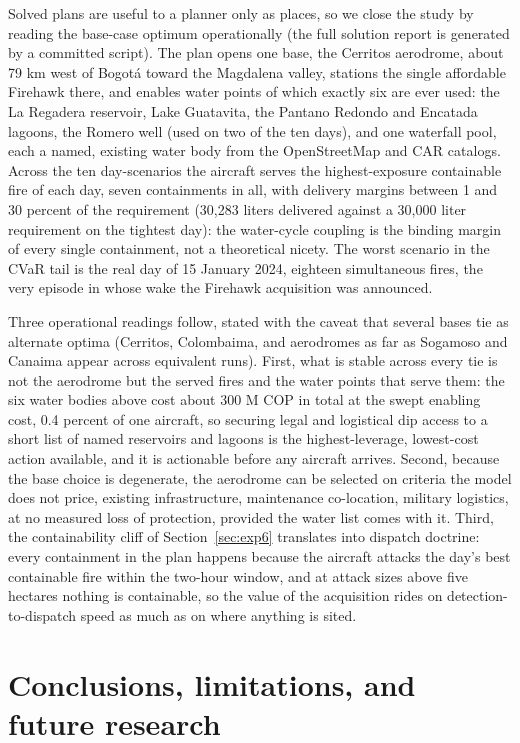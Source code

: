 \documentclass[11pt]{article}
\begin{document}
Solved plans are useful to a planner only as places, so we close the
study by reading the base-case optimum operationally (the full
solution report is generated by a committed script). The plan opens
one base, the Cerritos aerodrome, about 79 km west of Bogot{\'a}
toward the Magdalena valley, stations the single affordable Firehawk
there, and enables water points of which exactly six are ever used:
the La Regadera reservoir, Lake Guatavita, the Pantano Redondo and
Encatada lagoons, the Romero well (used on two of the ten days), and
one waterfall pool, each a named, existing water body from the
OpenStreetMap and CAR catalogs. Across the ten day-scenarios the
aircraft serves the highest-exposure containable fire of each day,
seven containments in all, with delivery margins between 1 and 30
percent of the requirement (30,283 liters delivered against a 30,000
liter requirement on the tightest day): the water-cycle coupling is
the binding margin of every single containment, not a theoretical
nicety. The worst scenario in the CVaR tail is the real day of 15
January 2024, eighteen simultaneous fires, the very episode in whose
wake the Firehawk acquisition was announced.

Three operational readings follow, stated with the caveat that
several bases tie as alternate optima (Cerritos, Colombaima, and
aerodromes as far as Sogamoso and Canaima appear across equivalent
runs). First, what is stable across every tie is not the aerodrome
but the served fires and the water points that serve them: the six
water bodies above cost about 300 M COP in total at the swept
enabling cost, 0.4 percent of one aircraft, so securing legal and
logistical dip access to a short list of named reservoirs and
lagoons is the highest-leverage, lowest-cost action available, and
it is actionable before any aircraft arrives. Second, because the
base choice is degenerate, the aerodrome can be selected on criteria
the model does not price, existing infrastructure, maintenance
co-location, military logistics, at no measured loss of protection,
provided the water list comes with it. Third, the containability
cliff of Section~\ref{sec:exp6} translates into dispatch doctrine:
every containment in the plan happens because the aircraft attacks
the day's best containable fire within the two-hour window, and at
attack sizes above five hectares nothing is containable, so the
value of the acquisition rides on detection-to-dispatch speed as
much as on where anything is sited.

\section{Conclusions, limitations, and future research}
\label{sec:conclusions}
\end{document}
